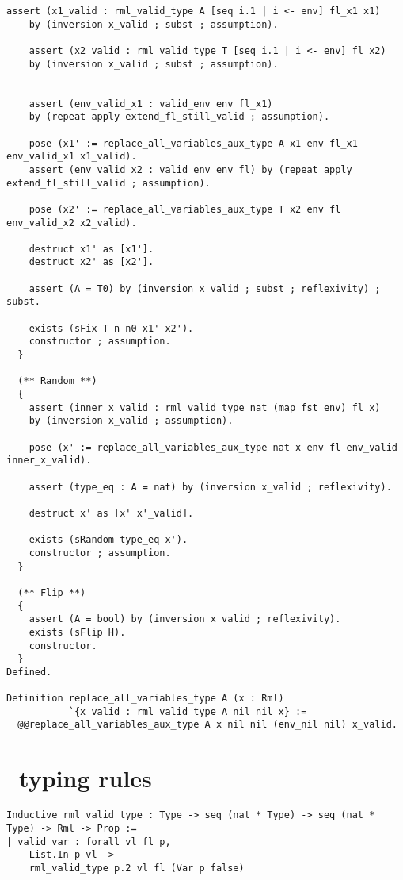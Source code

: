\documentclass[11pt, leqno, titlepage]{article}
\theoremstyle{definition}
\begin{document}
\begin{appendices}
\begin{lstlisting}[language=coq]
    assert (x1_valid : rml_valid_type A [seq i.1 | i <- env] fl_x1 x1) 
    by (inversion x_valid ; subst ; assumption).
    
    assert (x2_valid : rml_valid_type T [seq i.1 | i <- env] fl x2) 
    by (inversion x_valid ; subst ; assumption).

    
    assert (env_valid_x1 : valid_env env fl_x1) 
    by (repeat apply extend_fl_still_valid ; assumption).
    
    pose (x1' := replace_all_variables_aux_type A x1 env fl_x1 env_valid_x1 x1_valid).
    assert (env_valid_x2 : valid_env env fl) by (repeat apply extend_fl_still_valid ; assumption).
    
    pose (x2' := replace_all_variables_aux_type T x2 env fl env_valid_x2 x2_valid).

    destruct x1' as [x1'].
    destruct x2' as [x2'].
    
    assert (A = T0) by (inversion x_valid ; subst ; reflexivity) ; subst.
    
    exists (sFix T n n0 x1' x2').
    constructor ; assumption.
  }

  (** Random **)
  {
    assert (inner_x_valid : rml_valid_type nat (map fst env) fl x) 
    by (inversion x_valid ; assumption).

    pose (x' := replace_all_variables_aux_type nat x env fl env_valid inner_x_valid).

    assert (type_eq : A = nat) by (inversion x_valid ; reflexivity).

    destruct x' as [x' x'_valid].
    
    exists (sRandom type_eq x').
    constructor ; assumption.
  }

  (** Flip **)
  {
    assert (A = bool) by (inversion x_valid ; reflexivity).
    exists (sFlip H).
    constructor.
  }
Defined.

Definition replace_all_variables_type A (x : Rml)
           `{x_valid : rml_valid_type A nil nil x} :=
  @@replace_all_variables_aux_type A x nil nil (env_nil nil) x_valid.

\end{lstlisting}
  \newpage
  \section{\rmlx\ typing rules}
  \label{appendix:rmltypes}
\begin{lstlisting}[language=coq]
Inductive rml_valid_type : Type -> seq (nat * Type) -> seq (nat * Type) -> Rml -> Prop :=
| valid_var : forall vl fl p,
    List.In p vl ->
    rml_valid_type p.2 vl fl (Var p false)


\end{lstlisting}
\end{appendices}
\end{document}
